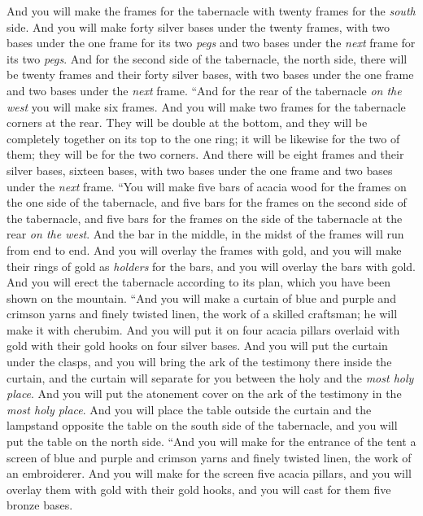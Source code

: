 \begin{biblechapter}
\verse And you will make the frames for the tabernacle with twenty frames for the \textit{south} side.
\verse And you will make forty silver bases under the twenty frames, with two bases under the one frame for its two \textit{pegs} and two bases under the \textit{next} frame for its two \textit{pegs}.
\verse And for the second side of the tabernacle, the north side, there will be twenty frames
\verse and their forty silver bases, with two bases under the one frame and two bases under the \textit{next} frame.
\verse “And for the rear of the tabernacle \textit{on the west} you will make six frames.
\verse And you will make two frames for the tabernacle corners at the rear.
\verse They will be double at the bottom, and they will be completely together on its top to the one ring; it will be likewise for the two of them; they will be for the two corners.
\verse And there will be eight frames and their silver bases, sixteen bases, with two bases under the one frame and two bases under the \textit{next} frame.
\verse “You will make five bars of acacia wood for the frames on the one side of the tabernacle,
\verse and five bars for the frames on the second side of the tabernacle, and five bars for the frames on the side of the tabernacle at the rear \textit{on the west}.
\verse And the bar in the middle, in the midst of the frames will run from end to end.
\verse And you will overlay the frames with gold, and you will make their rings of gold as \textit{holders} for the bars, and you will overlay the bars with gold.
\verse And you will erect the tabernacle according to its plan, which you have been shown on the mountain.
\verse “And you will make a curtain of blue and purple and crimson yarns and finely twisted linen, the work of a skilled craftsman; he will make it with cherubim.
\verse And you will put it on four acacia pillars overlaid with gold with their gold hooks on four silver bases.
\verse And you will put the curtain under the clasps, and you will bring the ark of the testimony there inside the curtain, and the curtain will separate for you between the holy and the \textit{most holy place}.
\verse And you will put the atonement cover on the ark of the testimony in the \textit{most holy place}.
\verse And you will place the table outside the curtain and the lampstand opposite the table on the south side of the tabernacle, and you will put the table on the north side.
\verse “And you will make for the entrance of the tent a screen of blue and purple and crimson yarns and finely twisted linen, the work of an embroiderer.
\verse And you will make for the screen five acacia pillars, and you will overlay them with gold with their gold hooks, and you will cast for them five bronze bases.
\end{biblechapter}

